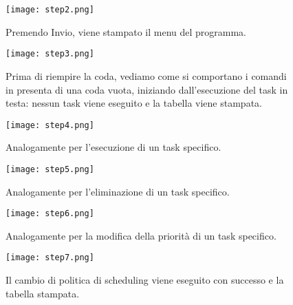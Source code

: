        	\begin{figure}[h!]
       		\begin{center}
       			\texttt{[image: step2.png]}
       		\end{center}
       		\caption{Premendo Invio, viene stampato il menu del programma.}
       		\label{fig:step2}
       	\end{figure}
       	
       	\begin{figure}[h!]
       		\begin{center}
       			\texttt{[image: step3.png]}
       		\end{center}
       		\caption{Prima di riempire la coda, vediamo come si comportano i comandi in presenta di una coda vuota, iniziando dall'esecuzione del task in testa: nessun task viene eseguito e la tabella viene stampata.}
       		\label{fig:step3}
       	\end{figure}
       	
       	\begin{figure}[h!]
       		\begin{center}
       			\texttt{[image: step4.png]}
       		\end{center}
       		\caption{Analogamente per l'esecuzione di un task specifico.}
       		\label{fig:step4}
       	\end{figure}
       	
       	\begin{figure}[h!]
       		\begin{center}
       			\texttt{[image: step5.png]}
       		\end{center}
       		\caption{Analogamente per l'eliminazione di un task specifico.}
       		\label{fig:step5}
       	\end{figure}
       	
       	\begin{figure}[h!]
       		\begin{center}
       			\texttt{[image: step6.png]}
       		\end{center}
       		\caption{Analogamente per la modifica della priorità di un task specifico.}
       		\label{fig:step6}
       	\end{figure}
       	
       	\begin{figure}[h!]
       		\begin{center}
       			\texttt{[image: step7.png]}
       		\end{center}
       		\caption{Il cambio di politica di scheduling viene eseguito con successo e la tabella stampata.}
       		\label{fig:step7}
       	\end{figure}
       	
